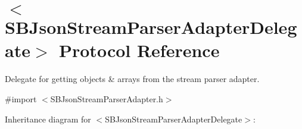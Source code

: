 \hypertarget{protocol_s_b_json_stream_parser_adapter_delegate-p}{
\section{$<$\-S\-B\-Json\-Stream\-Parser\-Adapter\-Delegate$>$ \-Protocol \-Reference}
\label{protocol_s_b_json_stream_parser_adapter_delegate-p}
}


\-Delegate for getting objects \& arrays from the stream parser adapter.  




{\ttfamily \#import $<$\-S\-B\-Json\-Stream\-Parser\-Adapter.\-h$>$}



\-Inheritance diagram for $<$\-S\-B\-Json\-Stream\-Parser\-Adapter\-Delegate$>$\-:
